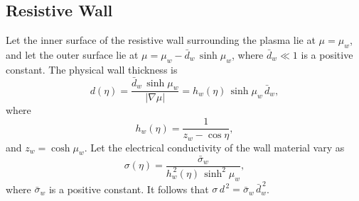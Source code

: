 \documentclass[12pt,prb,aps,notitlepage]{revtex4-1}
\begin{document}
\subsection{Resistive Wall}
Let the inner surface of the resistive wall surrounding the plasma lie at $\mu=\mu_w$,
and let the outer surface lie at $\mu=\mu_w-\bar{d}_w\,\sinh\mu_w$,  where $\bar{d}_w\ll 1$ is a positive constant. The physical wall thickness is
\begin{equation}
d(\eta)= \frac{\bar{d}_w\,\sinh\mu_w}{|\nabla \mu|} = h_w(\eta)\,\sinh \mu_w\,\bar{d}_w,
\end{equation}
where
\begin{equation}
h_w(\eta) = \frac{1}{z_w-\cos\eta},
\end{equation}
and $z_w=\cosh\mu_w$. 
Let the electrical conductivity of the wall material vary as
\begin{equation}
\sigma(\eta) = \frac{\bar{\sigma}_w}{h_w^{\,2}(\eta)\,\sinh^2 \mu_w},
\end{equation}
where $\bar{\sigma}_w$ is a positive constant. It follows that $\sigma\,d^{\,2}=\bar{\sigma}_w\,\bar{d}_w^{\,2}$. 
\end{document}
